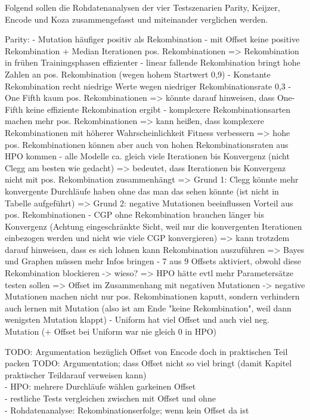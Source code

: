 Folgend sollen die Rohdatenanalysen der vier Testszenarien Parity, Keijzer, Encode und Koza zusammengefasst und miteinander verglichen werden.

Parity:
- Mutation häufiger positiv als Rekombination
- mit Offset keine positive Rekombination + Median Iterationen pos. Rekombinationen
=> Rekombination in frühen Trainingsphasen effizienter
- linear fallende Rekombination bringt hohe Zahlen an pos. Rekombination (wegen hohem Startwert 0,9)
- Konstante Rekombination recht niedrige Werte wegen niedriger Rekombinationsrate 0,3
- One Fifth kaum pos. Rekombinationen 
=> könnte darauf hinweisen, dass One-Fifth keine effiziente Rekombination ergibt
- komplexere Rekombinationsarten machen mehr pos. Rekombinationen
=> kann heißen, dass komplexere Rekombinationen mit höherer Wahrscheinlichkeit Fitness verbessern
=> hohe pos. Rekombinationen können aber auch von hohen Rekombinationsraten aus HPO kommen
- alle Modelle ca. gleich viele Iterationen bis Konvergenz (nicht Clegg am besten wie gedacht) => bedeutet, dass Iterationen bis Konvergenz nicht mit pos. Rekombination zusammenhängt
=> Grund 1: Clegg könnte mehr konvergente Durchläufe haben ohne das man das sehen könnte (ist nicht in Tabelle aufgeführt)
=> Grund 2: negative Mutationen beeinflussen Vorteil aus pos. Rekombinationen
- CGP ohne Rekombination brauchen länger bis Konvergenz (Achtung eingeschränkte Sicht, weil nur die konvergenten Iterationen einbezogen werden und nicht wie viele CGP konvergieren)
=> kann trotzdem darauf hinweisen, dass es sich lohnen kann Rekombination auszuführen
=> Bayes und Graphen müssen mehr Infos bringen
- 7 aus 9 Offsets aktiviert, obwohl diese Rekombination blockieren -> wieso?
=> HPO hätte evtl mehr Parametersätze testen sollen
=> Offset im Zusammenhang mit negativen Mutationen -> negative Mutationen machen nicht nur pos. Rekombinationen kaputt, sondern verhindern auch lernen mit Mutation (also ist am Ende "keine Rekombination", weil dann wenigsten Mutation klappt)
- Uniform hat viel Offset und auch viel neg. Mutation (+ Offset bei Uniform war nie gleich 0 in HPO)




TODO: Argumentation bezüglich Offset von Encode doch in praktischen Teil packen
TODO: Argumentation; dass Offset nicht so viel bringt (damit Kapitel \glqq praktischer Teil\grqq\space darauf verweisen kann)\\
- HPO: mehrere Durchläufe wählen garkeinen Offset\\
- restliche Tests vergleichen zwischen mit Offset und ohne\\
- Rohdatenanalyse: Rekombinationserfolge; wenn kein Offset da ist


